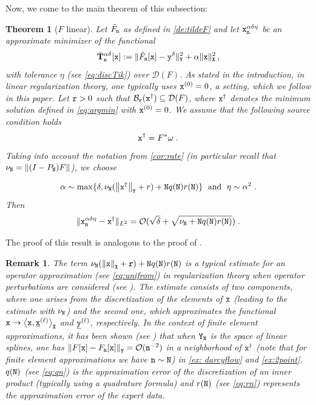 \documentclass[10pt]{article}
\numberwithin{equation}{section}
\newtheorem{theorem}[theorem]{Theorem}
\newtheorem{remark}[remark]{Remark}
\theoremstyle{nonumberplain}
\newcommand{\norm}[1]{\left\|#1\right\|}
\newcommand{\norms}[1]{\|#1\|}
\newcommand{\inner}[2]{\left<#1,#2\right>}
\newcommand{\X}{{\tt X}}
\newcommand{\Y}{{\tt Y}}
\newcommand{\y}{{\tt y}}
\newcommand{\yd}{\y^\delta}
\newcommand{\n}{{\tt n}}
\newcommand{\x}{{\tt x}}
\newcommand{\xdag}{\x^\dagger}
\newcommand{\ulx}{\underline{\x}}
\newcommand{\uly}{\underline{\y}}
\newcommand{\no}{{\tt N}}
\newcommand{\Tik}{\mathbf{T}}
\begin{document}
Now, we come to the main theorem of this subsection:
\begin{theorem}[$F$ linear] \label{th:linear} Let  $\tilde{F}_\n$ as defined in \autoref{de:tildeF} and 
let $\x_\n^{\alpha\delta\eta}$ be an approximate minimizer of the functional
\begin{equation} \label{eq:discTik_st}
	\tilde{\Tik}_{\n}^{\alpha\delta}[\x] := \norms{\tilde{F}_\n[\x]-\yd}_\Y^2 + \alpha \norms{\x}^2_{\X}\,,
\end{equation}
with tolerance $\eta$ (see \autoref{eq:discTik}) over $\mathcal{D}(F)$. As stated in the introduction, in linear regularization theory, one typically uses $\x^{(0)}=0$, a setting, which we follow in this paper.
Let ${\tt r} > 0$ such that $\mathcal{B}_{\tt r}(\xdag) \subseteq \mathcal{D}(F)$, where $\xdag$ denotes the minimum solution defined in \autoref{eq:argmin} with $\x^{(0)}=0$. We assume that the following \emph{source condition} holds
\begin{equation} \label{eq:source_linear}
	\xdag = F^* \omega\;.
\end{equation}
Taking into account the notation from \autoref{cor:rate} (in particular recall that $\nu_\no = \norm{(I-P_\no)F}$),
we choose 

\begin{equation*}
	\alpha \sim \max\{\delta,\nu_\no ( \norm{\xdag}_\Y + r) + \no q(\no)r(\no)\} \; \text{ and } \; \eta \sim \alpha^2 \;.
\end{equation*} 
Then
\begin{equation*}
	\norms{\x_\n^{\alpha\delta\eta}-\xdag}_{L^2} =  \mathcal{O}(\sqrt{\delta} + \sqrt{\nu_\no + \no q(\no)r(\no)})\;.
\end{equation*} 
\end{theorem}
The proof of this result is analogous to the proof of \cite[Theorem 2.3a]{NeuSch90}. 
	
\begin{remark} 
The term $\nu_\no (\norm{\x}_\X+{\tt r})+\no q(\no)r(\no)$ is a typical estimate for an operator approximation (see \autoref{eq:unifrom}) in regularization theory when operator perturbations are considered (see \cite{Gro84,EngKunNeu89,Neu89}). 
The estimate consists of two components, where one arises from the discretization of the elements of $\x$ (leading to the estimate with $\nu_\no$) and the second one, which approximates the functional $\x \to \inner{\x}{\ulx^{(\ell)}}_\X$ and $\uly^{(\ell)}$, respectively.
In the context of finite element approximations, it has been shown (see \cite{NeuSch90}) that when $\Y_\no$ is the space of linear splines, one has $\norm{F[\x]-F_\n[\x]}_\Y = \mathcal{O}(\n^{-2})$ in a neighborhood of $\xdag$ (note that for finite element approximations we have $\n \sim \no$)
in \autoref{ex: darcyflow} and \autoref{ex:2point}. $q(\no)$ (see \autoref{eq:qn}) is the approximation error of the discretization of an inner product (typically using a quadrature formula) and $r(\no)$ (see \autoref{eq:rn}) represents the approximation error of the expert data.
\end{remark}
\end{document}
